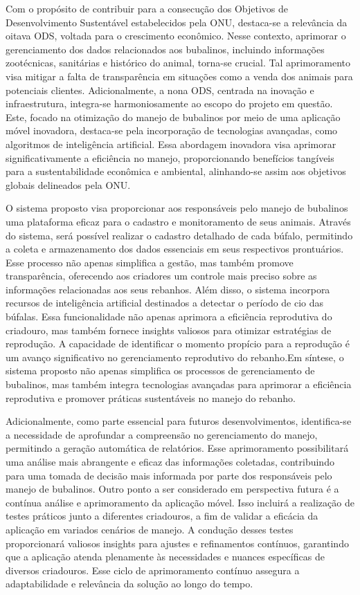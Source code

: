 Com o propósito de contribuir para a consecução dos Objetivos de Desenvolvimento Sustentável estabelecidos pela ONU, destaca-se a relevância da oitava ODS, voltada para o crescimento econômico. Nesse contexto, aprimorar o gerenciamento dos dados relacionados aos bubalinos, incluindo informações zootécnicas, sanitárias e histórico do animal, torna-se crucial. Tal aprimoramento visa mitigar a falta de transparência em situações como a venda dos animais para potenciais clientes.
Adicionalmente, a nona ODS, centrada na inovação e infraestrutura, integra-se harmoniosamente ao escopo do projeto em questão. Este, focado na otimização do manejo de bubalinos por meio de uma aplicação móvel inovadora, destaca-se pela incorporação de tecnologias avançadas, como algoritmos de inteligência artificial. Essa abordagem inovadora visa aprimorar significativamente a eficiência no manejo, proporcionando benefícios tangíveis para a sustentabilidade econômica e ambiental, alinhando-se assim aos objetivos globais delineados pela ONU.

O sistema proposto visa proporcionar aos responsáveis pelo manejo de bubalinos uma plataforma eficaz para o cadastro e monitoramento de seus animais. Através do sistema, será possível realizar o cadastro detalhado de cada búfalo, permitindo a coleta e armazenamento dos dados essenciais em seus respectivos prontuários. Esse processo não apenas simplifica a gestão, mas também promove transparência, oferecendo aos criadores um controle mais preciso sobre as informações relacionadas aos seus rebanhos.
Além disso, o sistema incorpora recursos de inteligência artificial destinados a detectar o período de cio das búfalas. Essa funcionalidade não apenas aprimora a eficiência reprodutiva do criadouro, mas também fornece insights valiosos para otimizar estratégias de reprodução. A capacidade de identificar o momento propício para a reprodução é um avanço significativo no gerenciamento reprodutivo do rebanho.Em síntese, o sistema proposto não apenas simplifica os processos de gerenciamento de bubalinos, mas também integra tecnologias avançadas para aprimorar a eficiência reprodutiva e promover práticas sustentáveis no manejo do rebanho.

Adicionalmente, como parte essencial para futuros desenvolvimentos, identifica-se a necessidade de aprofundar a compreensão no gerenciamento do manejo, permitindo a geração automática de relatórios. Esse aprimoramento possibilitará uma análise mais abrangente e eficaz das informações coletadas, contribuindo para uma tomada de decisão mais informada por parte dos responsáveis pelo manejo de bubalinos.
Outro ponto a ser considerado em perspectiva futura é a contínua análise e aprimoramento da aplicação móvel. Isso incluirá a realização de testes práticos junto a diferentes criadouros, a fim de validar a eficácia da aplicação em variados cenários de manejo. A condução desses testes proporcionará valiosos insights para ajustes e refinamentos contínuos, garantindo que a aplicação atenda plenamente às necessidades e nuances específicas de diversos criadouros. Esse ciclo de aprimoramento contínuo assegura a adaptabilidade e relevância da solução ao longo do tempo.


